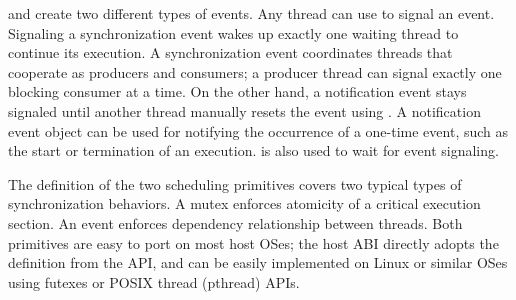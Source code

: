  and  create two different types of events.
Any thread can use  to signal an event.
Signaling a synchronization event wakes up exactly one waiting thread to continue its execution.
A synchronization event coordinates threads that cooperate as producers and consumers;
a producer thread can signal exactly one blocking consumer at a time.
On the other hand, a notification event stays signaled until another thread
manually resets the event using .
A notification event object can be used for notifying the occurrence of a one-time event,
such as the start or termination of an execution.
is also used
to wait for event signaling.



The definition of the two scheduling primitives
covers two typical types of synchronization behaviors.
A mutex enforces atomicity of a critical
execution section.
An event enforces dependency relationship between
threads.
Both primitives are easy to port on most host OSes;
the host ABI directly adopts the definition from the \win{} API, and can be easily implemented
on Linux or similar OSes using futexes or POSIX thread (pthread) APIs. 







